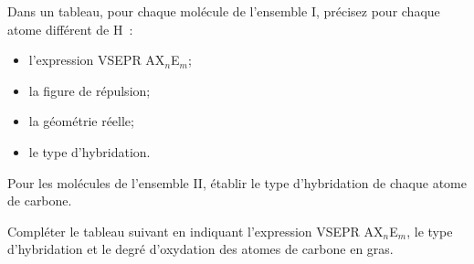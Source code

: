 

Dans un tableau, pour chaque mol\'ecule de l'ensemble I, pr\'ecisez pour chaque atome diff\'erent de H~:

\begin{itemize}
\item l'expression VSEPR AX$_n$E$_m$;
\item la figure de r\'epulsion;
\item la g\'eom\'etrie r\'eelle;
\item le type d'hybridation.
\end{itemize}



Pour les mol\'ecules de l'ensemble II, \'etablir le type d'hybridation de chaque atome de carbone.


Compl\'eter le tableau suivant en indiquant l'expression VSEPR AX$_n$E$_m$, le type 
d'hybridation et le degr\'e d'oxydation des atomes de carbone en gras.

\clearpage

